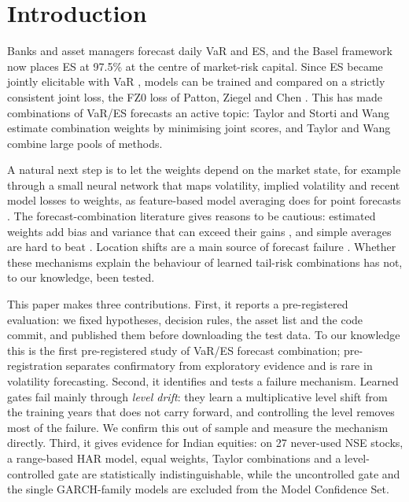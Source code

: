 \documentclass[conference]{IEEEtran}
\begin{document}
\section{Introduction}

Banks and asset managers forecast daily VaR and ES, and the Basel framework now places ES at 97.5\% at the centre of market-risk capital. Since ES became jointly elicitable with VaR \cite{fissler2016}, models can be trained and compared on a strictly consistent joint loss, the FZ0 loss of Patton, Ziegel and Chen \cite{patton2019}. This has made combinations of VaR/ES forecasts an active topic: Taylor \cite{taylor2020} and Storti and Wang \cite{storti2023} estimate combination weights by minimising joint scores, and Taylor and Wang \cite{taylorwang2025} combine large pools of methods.

A natural next step is to let the weights depend on the market state, for example through a small neural network that maps volatility, implied volatility and recent model losses to weights, as feature-based model averaging does for point forecasts \cite{montero2020}. The forecast-combination literature gives reasons to be cautious: estimated weights add bias and variance that can exceed their gains \cite{claeskens2016,smith2009,elliott2026}, and simple averages are hard to beat \cite{stock2004}. Location shifts are a main source of forecast failure \cite{clements1998}. Whether these mechanisms explain the behaviour of learned tail-risk combinations has not, to our knowledge, been tested.

This paper makes three contributions. First, it reports a pre-registered evaluation: we fixed hypotheses, decision rules, the asset list and the code commit, and published them before downloading the test data. To our knowledge this is the first pre-registered study of VaR/ES forecast combination; pre-registration separates confirmatory from exploratory evidence \cite{nosek2018} and is rare in volatility forecasting. Second, it identifies and tests a failure mechanism. Learned gates fail mainly through \emph{level drift}: they learn a multiplicative level shift from the training years that does not carry forward, and controlling the level removes most of the failure. We confirm this out of sample and measure the mechanism directly. Third, it gives evidence for Indian equities: on 27 never-used NSE stocks, a range-based HAR model, equal weights, Taylor combinations and a level-controlled gate are statistically indistinguishable, while the uncontrolled gate and the single GARCH-family models are excluded from the Model Confidence Set.
\end{document}

